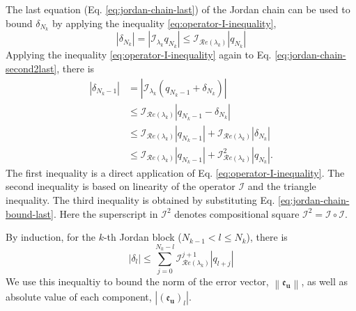 \documentclass[accepted]{uai2023}
\newcommand{\vect}[1]{\mathbf{#1}}
\newcommand{\Err}{\mathfrak{e}}
\newcommand{\I}{\mathcal{I}}
\renewcommand{\Re}[1]{\mathcal{R}e\left(#1\right)}
\begin{document}
    The last equation (Eq. \ref{eq:jordan-chain-last}) of the Jordan chain can be used to bound $\delta_{N_k}$ by applying the inequality \ref{eq:operator-I-inequality}, 
    \begin{equation}\label{eq:jordan-chain-bound-last}
        |\delta_{N_k}| = \left|\I_{\lambda_k}q_{N_k}\right| \leq \I_{\Re{\lambda_k}} |q_{N_k}|
    \end{equation}
    Applying the inequality \ref{eq:operator-I-inequality} again to Eq. \ref{eq:jordan-chain-second2last}, there is
    \begin{align}
        |\delta_{N_k-1}| &= \left|\I_{\lambda_k}\left(q_{N_k - 1} + \delta_{N_k}\right)\right| \\
        &\leq \I_{\Re{\lambda_k}} |q_{N_k - 1} - \delta_{N_k}| \\
        &\leq \I_{\Re{\lambda_k}} |q_{N_k - 1}| + \I_{\Re{\lambda_k}} |\delta_{N_k}| \\
        &\leq \I_{\Re{\lambda_k}} |q_{N_k - 1}| + \I_{\Re{\lambda_k}}^2 |q_{N_k}|.
    \end{align}
    The first inequality is a direct application of Eq. \ref{eq:operator-I-inequality}. 
    The second inequality is based on linearity of the operator $\I$ and the triangle inequality. 
    The third inequality is obtained by substituting Eq. \ref{eq:jordan-chain-bound-last}.
    Here the superscript in $\I^2$ denotes compositional square $\I^2 = \I\circ\I$.

    By induction, for the $k$-th Jordan block ($N_{k-1} < l \leq N_k$), there is
    \begin{equation}\label{eq:system-scalar-inequality-transformed}
        |\delta_{l}|  \leq \sum_{j=0}^{N_k - l} \I_{\Re{\lambda_k}} ^ {j+1} |q_{l+j}|
    \end{equation}
    We use this inequaltiy to bound the norm of the error vector, $\left\|\Err_\vect{u}\right\|$, as well as absolute value of each component, $\left|\left(\Err_{\vect{u}}\right)_l\right|$. 
\end{document}

